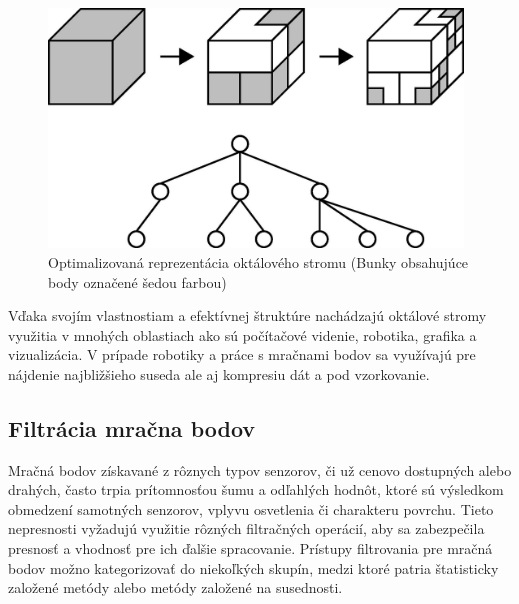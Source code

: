 \newline\begin{figure}[!htbp]
  \centering
  \includegraphics[width=11cm]{img/oct_tree_part.jpg}
  \caption{Optimalizovaná reprezentácia oktálového stromu (Bunky obsahujúce body označené šedou farbou) \cite{oct_tree}}
  \label{vzhladobr}
\end{figure}
\newline\indent Vďaka svojím vlastnostiam a efektívnej štruktúre nachádzajú oktálové stromy využitia v mnohých oblastiach ako sú počítačové videnie, robotika, grafika a vizualizácia.  V prípade robotiky a práce s mračnami bodov sa využívajú pre nájdenie najbližšieho suseda ale aj kompresiu dát a pod vzorkovanie.

\subsection{Filtrácia mračna bodov}
\noindent Mračná bodov získavané z rôznych typov senzorov, či už cenovo dostupných alebo drahých, často trpia prítomnosťou šumu a odľahlých hodnôt, ktoré sú výsledkom obmedzení samotných senzorov, vplyvu osvetlenia či charakteru povrchu. Tieto nepresnosti vyžadujú využitie rôzných filtračných operácií, aby sa zabezpečila presnosť a vhodnosť pre ich ďalšie spracovanie. Prístupy filtrovania pre mračná bodov možno kategorizovať do niekoľkých skupín, medzi ktoré patria štatisticky založené metódy alebo metódy založené na susednosti. \cite{point_cloud_filtering}

